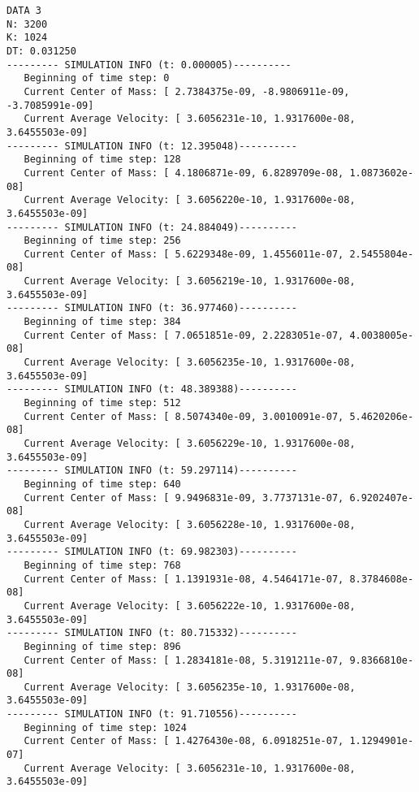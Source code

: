 \documentclass[11pt]{article}
\begin{document}
\begin{verbatim}
DATA 3
N: 3200
K: 1024
DT: 0.031250
--------- SIMULATION INFO (t: 0.000005)----------
   Beginning of time step: 0
   Current Center of Mass: [ 2.7384375e-09, -8.9806911e-09, -3.7085991e-09]
   Current Average Velocity: [ 3.6056231e-10, 1.9317600e-08, 3.6455503e-09]
--------- SIMULATION INFO (t: 12.395048)----------
   Beginning of time step: 128
   Current Center of Mass: [ 4.1806871e-09, 6.8289709e-08, 1.0873602e-08]
   Current Average Velocity: [ 3.6056220e-10, 1.9317600e-08, 3.6455503e-09]
--------- SIMULATION INFO (t: 24.884049)----------
   Beginning of time step: 256
   Current Center of Mass: [ 5.6229348e-09, 1.4556011e-07, 2.5455804e-08]
   Current Average Velocity: [ 3.6056219e-10, 1.9317600e-08, 3.6455503e-09]
--------- SIMULATION INFO (t: 36.977460)----------
   Beginning of time step: 384
   Current Center of Mass: [ 7.0651851e-09, 2.2283051e-07, 4.0038005e-08]
   Current Average Velocity: [ 3.6056235e-10, 1.9317600e-08, 3.6455503e-09]
--------- SIMULATION INFO (t: 48.389388)----------
   Beginning of time step: 512
   Current Center of Mass: [ 8.5074340e-09, 3.0010091e-07, 5.4620206e-08]
   Current Average Velocity: [ 3.6056229e-10, 1.9317600e-08, 3.6455503e-09]
--------- SIMULATION INFO (t: 59.297114)----------
   Beginning of time step: 640
   Current Center of Mass: [ 9.9496831e-09, 3.7737131e-07, 6.9202407e-08]
   Current Average Velocity: [ 3.6056228e-10, 1.9317600e-08, 3.6455503e-09]
--------- SIMULATION INFO (t: 69.982303)----------
   Beginning of time step: 768
   Current Center of Mass: [ 1.1391931e-08, 4.5464171e-07, 8.3784608e-08]
   Current Average Velocity: [ 3.6056222e-10, 1.9317600e-08, 3.6455503e-09]
--------- SIMULATION INFO (t: 80.715332)----------
   Beginning of time step: 896
   Current Center of Mass: [ 1.2834181e-08, 5.3191211e-07, 9.8366810e-08]
   Current Average Velocity: [ 3.6056235e-10, 1.9317600e-08, 3.6455503e-09]
--------- SIMULATION INFO (t: 91.710556)----------
   Beginning of time step: 1024
   Current Center of Mass: [ 1.4276430e-08, 6.0918251e-07, 1.1294901e-07]
   Current Average Velocity: [ 3.6056231e-10, 1.9317600e-08, 3.6455503e-09]


\end{verbatim}
\end{document}
